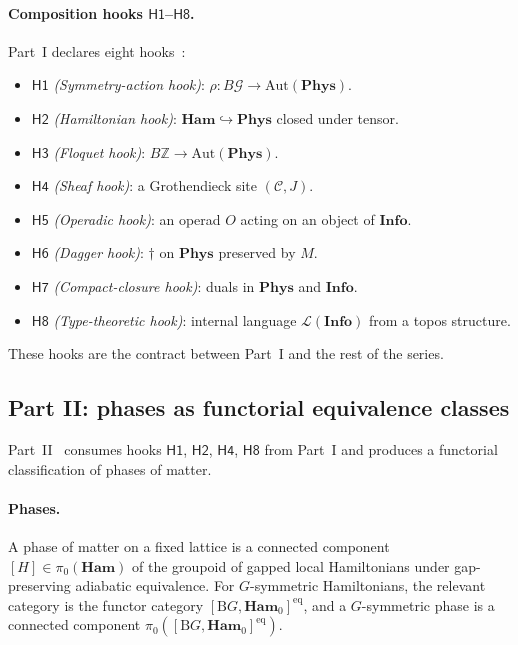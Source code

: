 \documentclass[12pt]{article}
\theoremstyle{definition}
\theoremstyle{remark}
\newcommand{\C}{\mathcal{C}}
\newcommand{\Phys}{\mathbf{Phys}}
\newcommand{\Info}{\mathbf{Info}}
\newcommand{\Ham}{\mathbf{Ham}}
\newcommand{\BG}{\mathrm{B}G}
\newcommand{\Z}{\mathbb{Z}}
\begin{document}
\paragraph{Composition hooks $\mathsf{H1}$--$\mathsf{H8}$.} Part~I declares
eight hooks~\cite[Section 2.3]{partI}:
\begin{itemize}[leftmargin=2em]
\item $\mathsf{H1}$ \emph{(Symmetry-action hook)}: $\rho : B\mathcal{G} \to
  \mathrm{Aut}(\Phys)$.
\item $\mathsf{H2}$ \emph{(Hamiltonian hook)}: $\Ham \hookrightarrow \Phys$
  closed under tensor.
\item $\mathsf{H3}$ \emph{(Floquet hook)}: $B\Z \to \mathrm{Aut}(\Phys)$.
\item $\mathsf{H4}$ \emph{(Sheaf hook)}: a Grothendieck site $(\C, J)$.
\item $\mathsf{H5}$ \emph{(Operadic hook)}: an operad $O$ acting on an object
  of $\Info$.
\item $\mathsf{H6}$ \emph{(Dagger hook)}: $\dagger$ on $\Phys$ preserved by
  $M$.
\item $\mathsf{H7}$ \emph{(Compact-closure hook)}: duals in $\Phys$ and
  $\Info$.
\item $\mathsf{H8}$ \emph{(Type-theoretic hook)}: internal language
  $\mathcal{L}(\Info)$ from a topos structure.
\end{itemize}

These hooks are the contract between Part~I and the rest of the series.

\subsection{Part II: phases as functorial equivalence classes}
\label{sec:recap-II}

Part~II~\cite{partII} consumes hooks $\mathsf{H1}$, $\mathsf{H2}$,
$\mathsf{H4}$, $\mathsf{H8}$ from Part~I and produces a functorial
classification of phases of matter.

\paragraph{Phases.} A phase of matter on a fixed lattice is a connected
component $[H] \in \pi_0(\Ham)$ of the groupoid of gapped local Hamiltonians
under gap-preserving adiabatic equivalence. For $G$-symmetric Hamiltonians,
the relevant category is the functor category $[\BG, \Ham_0]^{\mathrm{eq}}$,
and a $G$-symmetric phase is a connected component $\pi_0([\BG,
\Ham_0]^{\mathrm{eq}})$.
\end{document}
